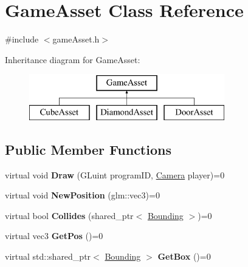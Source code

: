 \hypertarget{classGameAsset}{\section{Game\-Asset Class Reference}
\label{classGameAsset}
}


{\ttfamily \#include $<$game\-Asset.\-h$>$}

Inheritance diagram for Game\-Asset\-:\begin{figure}[H]
\begin{center}
\leavevmode
\includegraphics[height=2.000000cm]{classGameAsset}
\end{center}
\end{figure}
\subsection*{Public Member Functions}
\begin{DoxyCompactItemize}
\item 
\hypertarget{classGameAsset_a92268ca0263abe7b9872b77715b50738}{virtual void {\bfseries Draw} (G\-Luint program\-I\-D, \hyperlink{classCamera}{Camera} player)=0}\label{classGameAsset_a92268ca0263abe7b9872b77715b50738}

\item 
\hypertarget{classGameAsset_a2d2ea486dabaf5f437097d5067fddb2e}{virtual void {\bfseries New\-Position} (glm\-::vec3)=0}\label{classGameAsset_a2d2ea486dabaf5f437097d5067fddb2e}

\item 
\hypertarget{classGameAsset_aea9cba492bd511d352743aa2ca997987}{virtual bool {\bfseries Collides} (shared\-\_\-ptr$<$ \hyperlink{classBounding}{Bounding} $>$)=0}\label{classGameAsset_aea9cba492bd511d352743aa2ca997987}

\item 
\hypertarget{classGameAsset_a15c1762c2ece860d861cf03109a06093}{virtual vec3 {\bfseries Get\-Pos} ()=0}\label{classGameAsset_a15c1762c2ece860d861cf03109a06093}

\item 
\hypertarget{classGameAsset_a1b58e9f5e9603a0e9bd014bc466c30bd}{virtual std\-::shared\-\_\-ptr$<$ \hyperlink{classBounding}{Bounding} $>$ {\bfseries Get\-Box} ()=0}\label{classGameAsset_a1b58e9f5e9603a0e9bd014bc466c30bd}

\end{DoxyCompactItemize}


